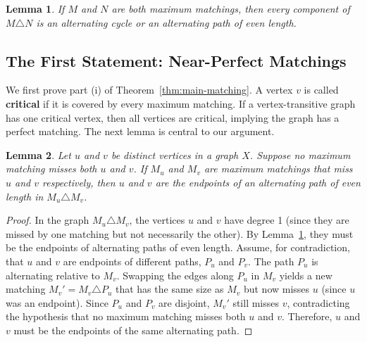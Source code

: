 \documentclass[12pt,a4paper,openany]{book}
\newtheorem{lemma}{Lemma}[section]
\begin{document}
\begin{lemma}\label{lem:max-matching-symdiff}
If $M$ and $N$ are both maximum matchings, then every component of $M \triangle N$ is an alternating cycle or an alternating path of even length.
\end{lemma}

\subsection*{The First Statement: Near-Perfect Matchings}

We first prove part (i) of Theorem~\ref{thm:main-matching}. A vertex $v$ is called \textbf{critical} if it is covered by every maximum matching. If a vertex-transitive graph has one critical vertex, then all vertices are critical, implying the graph has a perfect matching. The next lemma is central to our argument.

\begin{lemma}\label{lem:even-path}
Let $u$ and $v$ be distinct vertices in a graph $X$. Suppose no maximum matching misses both $u$ and $v$. If $M_u$ and $M_v$ are maximum matchings that miss $u$ and $v$ respectively, then $u$ and $v$ are the endpoints of an alternating path of even length in $M_u \triangle M_v$.
\end{lemma}
\begin{proof}
In the graph $M_u \triangle M_v$, the vertices $u$ and $v$ have degree 1 (since they are missed by one matching but not necessarily the other). By Lemma~\ref{lem:max-matching-symdiff}, they must be the endpoints of alternating paths of even length. Assume, for contradiction, that $u$ and $v$ are endpoints of different paths, $P_u$ and $P_v$. The path $P_u$ is alternating relative to $M_v$. Swapping the edges along $P_u$ in $M_v$ yields a new matching $M_v' = M_v \triangle P_u$ that has the same size as $M_v$ but now misses $u$ (since $u$ was an endpoint). Since $P_u$ and $P_v$ are disjoint, $M_v'$ still misses $v$, contradicting the hypothesis that no maximum matching misses both $u$ and $v$. Therefore, $u$ and $v$ must be the endpoints of the same alternating path.
\end{proof}
\end{document}
